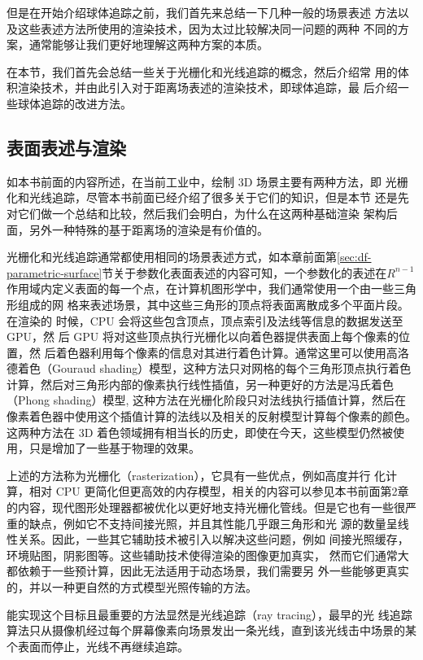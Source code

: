 但是在开始介绍球体追踪之前，我们首先来总结一下几种一般的场景表述 方法以及这些表述方法所使用的渲染技术，因为太过比较解决同一问题的两种 不同的方案，通常能够让我们更好地理解这两种方案的本质。

在本节，我们首先会总结一些关于光栅化和光线追踪的概念，然后介绍常 用的体积渲染技术，并由此引入对于距离场表述的渲染技术，即球体追踪，最 后介绍一些球体追踪的改进方法。




\subsection{表面表述与渲染}
如本书前面的内容所述，在当前工业中，绘制 3D 场景主要有两种方法，即 光栅化和光线追踪，尽管本书前面已经介绍了很多关于它们的知识，但是本节 还是先对它们做一个总结和比较，然后我们会明白，为什么在这两种基础渲染 架构后面，另外一种特殊的基于距离场的渲染是有价值的。

光栅化和光线追踪通常都使用相同的场景表述方式，如本章前面第\ref{sec:df-parametric-surface}节关于参数化表面表述的内容可知，一个参数化的表述在$R^{n−1}$作用域内定义表面的每一个点，在计算机图形学中，我们通常使用一个由一些三角形组成的网 格来表述场景，其中这些三角形的顶点将表面离散成多个平面片段。在渲染的 时候，CPU 会将这些包含顶点，顶点索引及法线等信息的数据发送至 GPU，然 后 GPU 将对这些顶点执行光栅化以向着色器提供表面上每个像素的位置，然 后着色器利用每个像素的信息对其进行着色计算。通常这里可以使用高洛德着色（Gouraud shading）模型，这种方法只对网格的每个三角形顶点执行着色计算，然后对三角形内部的像素执行线性插值，另一种更好的方法是冯氏着色（Phong shading）模型, 这种方法在光栅化阶段只对法线执行插值计算，然后在像素着色器中使用这个插值计算的法线以及相关的反射模型计算每个像素的颜色。这两种方法在 3D 着色领域拥有相当长的历史，即使在今天，这些模型仍然被使用，只是增加了一些基于物理的效果。

上述的方法称为光栅化（rasterization），它具有一些优点，例如高度并行 化计算，相对 CPU 更简化但更高效的内存模型，相关的内容可以参见本书前面第2章的内容，现代图形处理器都被优化以更好地支持光栅化管线。但是它也有一些很严重的缺点，例如它不支持间接光照，并且其性能几乎跟三角形和光 源的数量呈线性关系。因此，一些其它辅助技术被引入以解决这些问题，例如 间接光照缓存，环境贴图，阴影图等。这些辅助技术使得渲染的图像更加真实， 然而它们通常大都依赖于一些预计算，因此无法适用于动态场景，我们需要另 外一些能够更真实的，并以一种更自然的方式模型光照传输的方法。

能实现这个目标且最重要的方法显然是光线追踪（ray tracing），最早的光 线追踪算法只从摄像机经过每个屏幕像素向场景发出一条光线，直到该光线击中场景的某个表面而停止，光线不再继续追踪。

